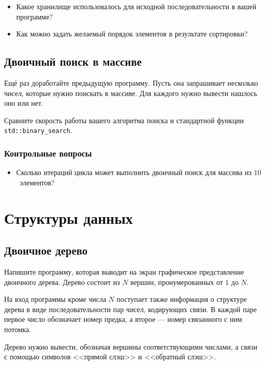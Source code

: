 \documentclass[10pt,twoside,openany]{book}
\begin{document}
\begin{itemize}
    \item Какое хранилище использовалось для исходной последовательности в вашей программе?
    \item Как можно задать желаемый порядок элементов в результате сортировки?
\end{itemize}

\section{Двоичный поиск в массиве}

Ещё раз доработайте предыдущую программу. Пусть она запрашивает несколько чисел, которые нужно
поискать в массиве. Для каждого нужно вывести нашлось оно или нет.

Сравните скорость работы вашего алгоритма поиска и стандартной функции
{\tt std::binary\_search}.

\subsection*{Контрольные вопросы}

\begin{itemize}
    \item Сколько итераций цикла может выполнить двоичный поиск для массива
          из $10$~элементов?
\end{itemize}


\chapter{Структуры данных}

\section{Двоичное дерево}

Напишите программу, которая выводит на экран графическое представление двоичного дерева.
Дерево состоит из $N$ вершин, пронумерованных от $1$ до $N$.

На вход программы кроме числа $N$ поступает также информация о структуре дерева
в виде последовательности пар чисел, кодирующих связи.
В каждой паре первое число обозначает номер предка, а второе --- номер связанного с ним потомка.

Дерево нужно вывести, обозначая вершины соответствующими числами, а связи с помощью символов
<<прямой слэш>> и <<обратный слэш>>.
\end{document}
